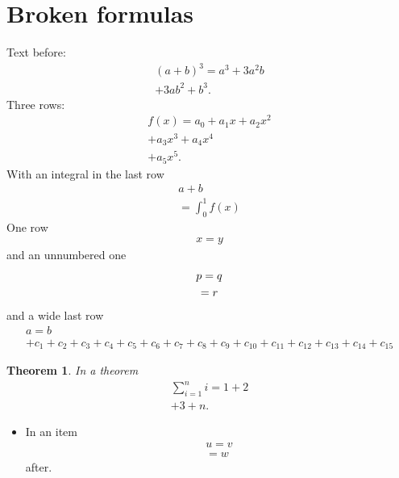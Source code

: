 \documentclass{article}
\newtheorem{theorem}{Theorem}
\begin{document}
\section{Broken formulas}
Text before:
\begin{multline}
  (a+b)^3 = a^3 + 3a^2b \\
  + 3ab^2 + b^3.
\end{multline}
Three rows:
\begin{multline*}
  f(x) = a_0 + a_1 x + a_2 x^2 \\
  + a_3 x^3 + a_4 x^4 \\
  + a_5 x^5.
\end{multline*}
With an integral in the last row
\begin{multline}
  a + b \\
  = \int_0^1 f(x)
\end{multline}
One row \begin{multline} x = y \end{multline} and an unnumbered one
\begin{multline}
  p = q \\ = r \notag
\end{multline}
and a wide last row
\begin{multline}
  a = b \\
  + c_1 + c_2 + c_3 + c_4 + c_5 + c_6 + c_7 + c_8 + c_9 + c_{10} + c_{11} + c_{12} + c_{13} + c_{14} + c_{15}
\end{multline}
\begin{theorem}
In a theorem
\begin{multline}
  \sum_{i=1}^n i = 1 + 2 \\
  + 3 + n.
\end{multline}
\end{theorem}
\begin{itemize}
\item In an item \begin{multline} u = v \\ = w \end{multline} after.
\end{itemize}
\end{document}
